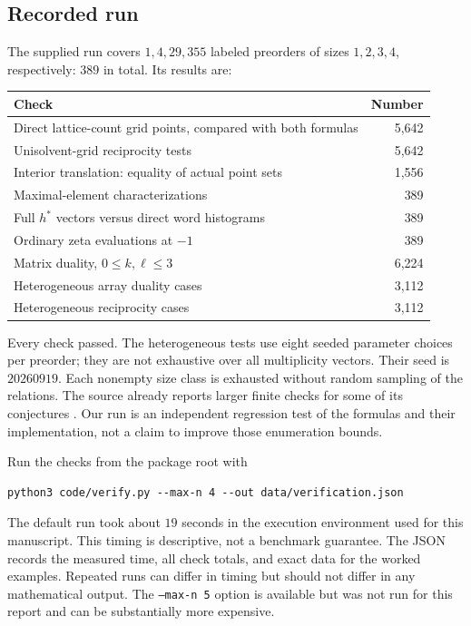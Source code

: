 \documentclass[11pt,letterpaper]{article}
\theoremstyle{definition}
\begin{document}
\subsection{Recorded run}
The supplied run covers $1,4,29,355$ labeled preorders of sizes
$1,2,3,4$, respectively: $389$ in total. Its results are:
\begin{center}
\begin{tabularx}{\textwidth}{@{}Xr@{}}
\toprule
Check & Number \\
\midrule
Direct lattice-count grid points, compared with both formulas & 5,642 \\
Unisolvent-grid reciprocity tests & 5,642 \\
Interior translation: equality of actual point sets & 1,556 \\
Maximal-element characterizations & 389 \\
Full $h^*$ vectors versus direct word histograms & 389 \\
Ordinary zeta evaluations at $-1$ & 389 \\
Matrix duality, $0\leq k,\ell\leq3$ & 6,224 \\
Heterogeneous array duality cases & 3,112 \\
Heterogeneous reciprocity cases & 3,112 \\
\bottomrule
\end{tabularx}
\end{center}
Every check passed. The heterogeneous tests use eight seeded parameter
choices per preorder; they are not exhaustive over all multiplicity vectors.
Their seed is $20260919$. Each nonempty size class is exhausted without
random sampling of the relations. The source already reports larger finite
checks for some of its conjectures \cite[Sections~4 and~7]{AC26}.
Our run is an independent regression test of the formulas and their
implementation, not a claim to improve those enumeration bounds.

Run the checks from the package root with
\begin{verbatim}
python3 code/verify.py --max-n 4 --out data/verification.json
\end{verbatim}
The default run took about $19$ seconds in the execution environment used
for this manuscript. This timing is descriptive, not a benchmark guarantee.
The JSON records the measured time, all check totals, and exact data for the
worked examples. Repeated runs can differ in timing but should not differ
in any mathematical output. The \texttt{--max-n 5} option is available but
was not run for this report and can be substantially more expensive.
\end{document}
